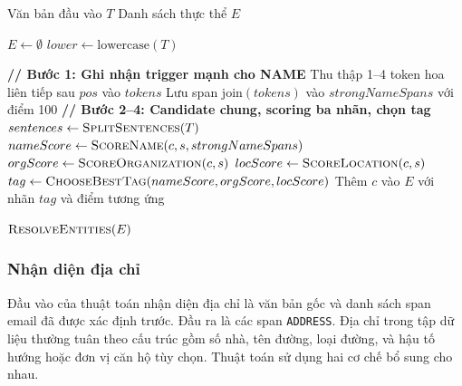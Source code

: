 \begin{algorithm}[H]
    \caption{Thuật toán nhận diện NAME, ORGANIZATION và LOCATION}
    \label{alg:detect_context_entities}
    \begin{algorithmic}[1]
        \Require Văn bản đầu vào $T$
        \Ensure Danh sách thực thể $E$

        \State $E \leftarrow \emptyset$
        \State $lower \leftarrow \text{lowercase}(T)$

        \Statex \hspace{-\algorithmicindent}\textbf{// Bước 1: Ghi nhận trigger mạnh cho NAME}
        \State Thu thập 1--4 token hoa liên tiếp sau $pos$ vào $tokens$
        \State Lưu span $\text{join}(tokens)$ vào $strongNameSpans$ với điểm 100
        \EndIf
        \EndFor
        \EndFor
        \Statex \hspace{-\algorithmicindent}\textbf{// Bước 2--4: Candidate chung, scoring ba nhãn, chọn tag}
        \State $sentences \leftarrow \textsc{SplitSentences}(T)$
        \State $nameScore \leftarrow \textsc{ScoreName}(c, s, strongNameSpans)$
        \State $orgScore \leftarrow \textsc{ScoreOrganization}(c, s)$
        \State $locScore \leftarrow \textsc{ScoreLocation}(c, s)$
        \State $tag \leftarrow \textsc{ChooseBestTag}(nameScore, orgScore, locScore)$
        \State Thêm $c$ vào $E$ với nhãn $tag$ và điểm tương ứng
        \EndIf
        \EndFor
        \EndFor

        \State \Return $\textsc{ResolveEntities}(E)$
    \end{algorithmic}
\end{algorithm}

\subsubsection{Nhận diện địa chỉ}

Đầu vào của thuật toán nhận diện địa chỉ là văn bản gốc và danh sách span email
đã được xác định trước. Đầu ra là các span \texttt{ADDRESS}. Địa chỉ trong tập
dữ liệu thường tuân theo cấu trúc gồm số nhà, tên đường, loại đường, và hậu tố
hướng hoặc đơn vị căn hộ tùy chọn. Thuật toán sử dụng hai cơ chế bổ sung cho
nhau.

